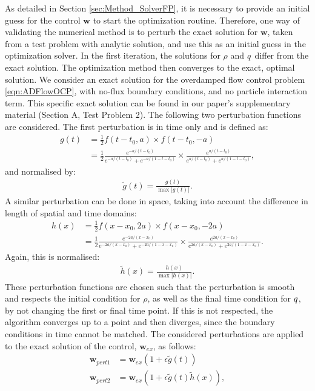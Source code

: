 
As detailed in Section \ref{sec:Method_SolverFP}, it is necessary to provide an initial guess for the control $\mathbf{w}$ to start the optimization routine. Therefore, one way of validating the numerical method is to perturb the exact solution for $\mathbf{w}$, taken from a test problem with analytic solution, and use this as an initial guess in the optimization solver. In the first iteration, the solutions for $\rho$ and $q$ differ from the exact solution. The optimization method then converges to the exact, optimal solution. We consider an exact solution for the overdamped flow control problem \eqref{eqn:ADFlowOCP}, with no-flux boundary conditions, and no particle interaction term. This specific exact solution can be found in our paper's supplementary material (Section A, Test Problem 2). 
The following two perturbation functions are considered. The first perturbation is in time only and is defined as:
\begin{align*}
g(t) &= \frac{1}{2} f(t-t_0, a) \times f(t-t_0, -a)\\
&= \frac{1}{2} \frac{e^{-a/(t-t_0)}}{e^{-a/(t-t_0)} + e^{-a/(1-t -t_0)}} \times \frac{e^{a/(t-t_0)}}{e^{a/(t-t_0)} + e^{a/(1-t - t_0)}},
\end{align*}
and normalised by:
\begin{align*}
\tilde g(t) = \frac{g(t)}{\max{|{g(t)}|}}.
\end{align*}
A similar perturbation can be done in space, taking into account the difference in length of spatial and time domains:
\begin{align*}
h(x) &= \frac{1}{2} f(x-x_0, 2a) \times f(x-x_0, -2a)\\
&= \frac{1}{2} \frac{e^{-2a/(x-x_0)}}{e^{-2a/(x-x_0)} + e^{-2a/(1-x-x_0)}} \times \frac{e^{2a/(x-x_0)}}{e^{2a/(x-x_0)} + e^{2a/(1-x-x_0)}}.
\end{align*}
Again, this is normalised:
\begin{align*}
\tilde h(x) = \frac{h(x)}{\max{|{h(x)}|}}.
\end{align*}
These perturbation functions are chosen such that the perturbation is smooth and respects the initial condition for $\rho$, as well as the final time condition for $q$, by not changing the first or final time point. If this is not respected, the algorithm converges up to a point and then diverges, since the boundary conditions in time cannot be matched.
The considered perturbations are applied to the exact solution of the control, $\mathbf{w}_{ex}$, as follows:
\begin{align*}
\mathbf{w}_{pert1} &= \mathbf{w}_{ex}(1+ \epsilon \tilde g(t))\\
\mathbf{w}_{pert2} &= \mathbf{w}_{ex}(1+ \epsilon \tilde g(t) \tilde h(x)),
\end{align*}
